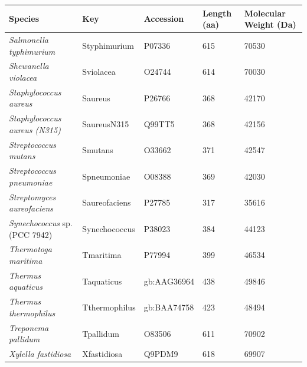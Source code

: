 \begin{table}

\begin{minipage}[c]{\textwidth}
\linespread{1}\normalsize
\renewcommand{\arraystretch}{1.3}
\renewcommand{\footnoterule}{}
\vspace{1em}
\begin{narrow}{-1in}{-1in}
\centering
\begin{small}
\begin{tabular}{@{}llllp{.7in}@{}}\toprule
\textbf{Species} & \textbf{Key} & \textbf{Accession} &
\textbf{Length (aa)} & \textbf{Molecular Weight (Da)}\\\midrule
{\it Salmonella typhimurium} & Styphimurium &     P07336 &        615 &      70530 \\

{\it Shewanella violacea} &  Sviolacea &     O24744 &        614 &      70030 \\

{\it Staphylococcus aureus} &    Saureus &     P26766 &        368 &      42170 \\

{\it Staphylococcus aureus (N315)} & SaureusN315 &     Q99TT5 &        368 &      42156 \\

{\it Streptococcus mutans} &    Smutans &     O33662 &        371 &      42547 \\

{\it Streptococcus pneumoniae} & Spneumoniae &     O08388 &        369 &      42030 \\

{\it Streptomyces aureofaciens} & Saureofaciens &     P27785 &        317 &      35616 \\

{\it Synechococcus} sp. (PCC 7942) & Synechococcus &     P38023 &        384 &      44123 \\

{\it Thermotoga maritima} &  Tmaritima &     P77994 &        399 &      46534 \\

{\it Thermus aquaticus} & Taquaticus & gb:AAG36964 &        438 &      49846 \\

{\it Thermus thermophilus} & Tthermophilus & gb:BAA74758 &        423 &      48494 \\

{\it Treponema pallidum} &  Tpallidum &     O83506 &        611 &      70902 \\

{\it Xylella fastidiosa} & Xfastidiosa &     Q9PDM9 &        618 &
69907 \\\bottomrule
\end{tabular}
\end{small}
\end{narrow}
\end{minipage}
\linespread{1.1}\normalsize
\end{table}
\FloatBarrier


